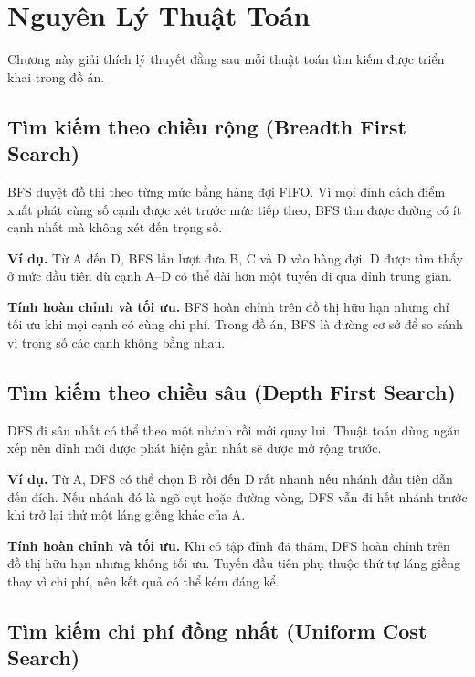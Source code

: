 
\chapter{Nguyên Lý Thuật Toán}
\label{chap:algorithm-principles}

Chương này giải thích lý thuyết đằng sau mỗi thuật toán tìm kiếm được triển khai trong đồ án.

\section{Tìm kiếm theo chiều rộng (Breadth First Search)}

BFS duyệt đồ thị theo từng mức bằng hàng đợi FIFO. Vì mọi đỉnh cách điểm xuất
phát cùng số cạnh được xét trước mức tiếp theo, BFS tìm được đường có ít cạnh
nhất mà không xét đến trọng số.

\textbf{Ví dụ.} Từ A đến D, BFS lần lượt đưa B, C và D vào hàng đợi. D được
tìm thấy ở mức đầu tiên dù cạnh A--D có thể dài hơn một tuyến đi qua đỉnh trung
gian.

\textbf{Tính hoàn chỉnh và tối ưu.} BFS hoàn chỉnh trên đồ thị hữu hạn nhưng
chỉ tối ưu khi mọi cạnh có cùng chi phí. Trong đồ án, BFS là đường cơ sở để so
sánh vì trọng số các cạnh không bằng nhau.

\section{Tìm kiếm theo chiều sâu (Depth First Search)}

DFS đi sâu nhất có thể theo một nhánh rồi mới quay lui. Thuật toán dùng ngăn
xếp nên đỉnh mới được phát hiện gần nhất sẽ được mở rộng trước.

\textbf{Ví dụ.} Từ A, DFS có thể chọn B rồi đến D rất nhanh nếu nhánh đầu tiên
dẫn đến đích. Nếu nhánh đó là ngõ cụt hoặc đường vòng, DFS vẫn đi hết nhánh
trước khi trở lại thử một láng giềng khác của A.

\textbf{Tính hoàn chỉnh và tối ưu.} Khi có tập đỉnh đã thăm, DFS hoàn chỉnh
trên đồ thị hữu hạn nhưng không tối ưu. Tuyến đầu tiên phụ thuộc thứ tự láng
giềng thay vì chi phí, nên kết quả có thể kém đáng kể.

\section{Tìm kiếm chi phí đồng nhất (Uniform Cost Search)}

